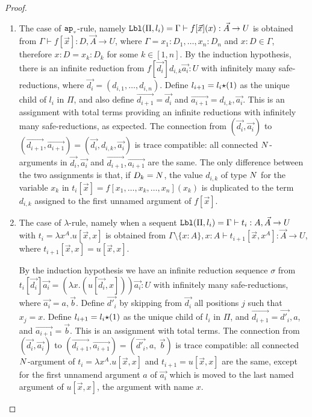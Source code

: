 \begin{proof}
\begin{enumerate}
\item
  The case of ${{\tt ap}_{\mbox{\tiny $v$}}}$-rule, namely 
  ${\tt Lbl}(\Pi,l_i) 
  = 
  \Gamma \vdash f[\vec{x}](x): \vec{A}\rightarrow U$ is obtained from
  $\Gamma \vdash f[\vec{x}]: D,\vec{A} \rightarrow U$,
  where $\Gamma=x_1:D_1,\ldots,x_n:D_n$ and $x:D\in\Gamma$, therefore
  $x:D = x_k:D_k$ for some $k \in [1,n]$. 
  By the induction hypothesis, 
  there is an infinite reduction from $f[\vec{d_i}]d_{i,k}\vec{a_i}: U$
  with infinitely many safe-reductions,
  where $\vec{d_i} = (d_{i,1},\ldots,d_{i,n})$. 
  Define $l_{i+1}=l_i{\star}(1)$ as the unique child of $l_i$ in $\Pi$, and
  also define $\vec{d_{i+1}} = \vec{d_i}$ and $\vec{a_{i+1}} = d_{i,k},\vec{a_i}$. 
  This is an assignment with total terms providing an infinite reductions with 
  infinitely many safe-reductions, as expected.
  The connection from
  $(\vec{d_i},\vec{a_i})$ to
  $(\vec{d_{i+1}},\vec{a_{i+1}}) = (\vec{d_i},d_{i,k},\vec{a_i})$
  is trace compatible: all connected ${N}$-arguments in $\vec{d_i},\vec{a_i}$ and 
  $\vec{d_{i+1}},\vec{a_{i+1}}$ are the same.  
  The only difference between the two assignments
  is that, if $D_k = {N}$, the value $d_{i,k}$ of type ${N}$ for the variable $x_k$
  in $t_i[\vec{x}]=f[x_1,\ldots,x_k,\ldots,x_n](x_k)$ is duplicated to the term $d_{i,k}$ 
  assigned to the first unnamed argument of $ f[\vec{x}]$. 


\item
  The case of $\lambda$-rule, namely when a sequent
  $
    {\tt Lbl}(\Pi,l_i) 
    = 
    \Gamma\vdash t_i : A, \vec{A} \rightarrow U
  $ 
  with 
  $
    t_i 
    = 
    \lambda x^A.u[\vec{x},x]
  $
  is obtained from
  $
  \Gamma\setminus\{x:A\},x:A
  \vdash 
  t_{i+1}[\vec{x},x^A]:\vec{A}\rightarrow U
  $, 
  where $t_{i+1}[\vec{x},x]=u[\vec{x},x]$.
  
  By the induction hypothesis we have an infinite reduction sequence $\sigma$ from
  $t_i[\vec{d_i}]\vec{a_i} = (\lambda x.(u[\vec{d_i},x]))\vec{a_i}: U$ 
  with infinitely many safe-reductions, where $\vec{a_i} = a,\vec{b}$. 
  Define $\vec{d'_i}$ by skipping from $\vec{d_i}$ all positions $j$ such that $x_j = x$.
  Define $l_{i+1}=l_i{\star}(1)$ as the unique child of $l_i$ in $\Pi$,
  and $\vec{d_{i+1}} = \vec{d'_i},a$, and $\vec{a_{i+1}} = \vec{b}$. 
  This is an assignment with total terms. The connection from 
  $(\vec{d_i},\vec{a_i})$ to $(\vec{d_{i+1}},\vec{a_{i+1}}) = (\vec{d'_i},a, \ \vec{b})$ is
  trace compatible: all connected ${N}$-argument of 
  $t_{i}=\lambda x^A.u[\vec{x},x]$ and $t_{i+1}=u[\vec{x},x]$ are 
  the same, except for the first unnamend argument $a$ of $\vec{a_i}$ which is moved to
  the last named argument of $u[\vec{x},x]$, the argument with name $x$.
 

\end{enumerate}
\end{proof}
